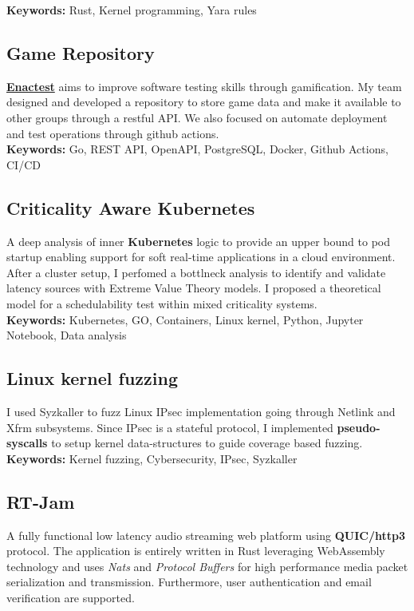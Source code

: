 \documentclass[11pt,a4paper]{article}
\begin{document}
  \textbf{Keywords:} Rust, Kernel programming, Yara rules 
  
  \subsection{Game Repository \href{https://github.com/alarmfox/game-repository}{\faGithub} \href{https://game-repository.capass.org}{\faLaptopCode}}
  \textbf{\href{https://enactest-project.eu/}{Enactest}} aims to improve software testing skills through gamification. My team designed and developed a repository to store game data and make it available to other groups through a restful API. We also focused on automate deployment and test operations through github actions. \\

  \textbf{Keywords:} Go, REST API, OpenAPI, PostgreSQL, Docker, Github Actions, CI/CD 

  \subsection{Criticality Aware Kubernetes \href{https://github.com/alarmfox/criticality-aware-kubernetes}{\faGithub}}
  A deep analysis of inner \textbf{Kubernetes} logic to provide an upper bound to pod startup enabling support for 
  soft real-time applications in a cloud environment. After a cluster setup, I perfomed a bottlneck analysis to identify and validate latency sources with Extreme Value Theory models. I proposed a theoretical model for a schedulability test within mixed criticality systems. \\

  \textbf{Keywords:} Kubernetes, GO, Containers, Linux kernel, Python, Jupyter Notebook, Data analysis

  \subsection{Linux kernel fuzzing \href{https://github.com/alarmfox/progetto-software-security}{\faGithub}}
  I used Syzkaller to fuzz Linux IPsec implementation going through Netlink and Xfrm subsystems. Since IPsec is a 
  stateful protocol, I implemented \textbf{pseudo-syscalls} to setup kernel data-structures to guide coverage based 
  fuzzing. \\

  \textbf{Keywords:} Kernel fuzzing, Cybersecurity, IPsec, Syzkaller 

  \subsection{RT-Jam \href{https://github.com/alarmfox/rt-jam}{\faGithub}}
  A fully functional low latency audio streaming web platform using \textbf{QUIC/http3} protocol. The application is entirely written in Rust leveraging WebAssembly technology and uses \textit{Nats} and \textit{Protocol Buffers} for high performance media packet serialization and transmission. Furthermore, user authentication and email verification are supported. \\
\end{document}
